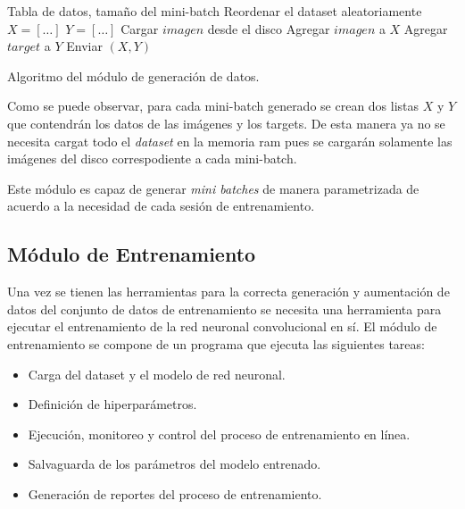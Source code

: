     \begin{algorithm}
        \begin{algorithmic}[1]
        \REQUIRE Tabla de datos, tamaño del mini-batch
        \STATE Reordenar el dataset aleatoriamente
            \STATE $X = [\dots]$
            \STATE $Y = [\dots]$
                \STATE Cargar $imagen$ desde el disco 
                \STATE Agregar $imagen$ a $X$
                \STATE Agregar $target$ a $Y$
            \ENDFOR
            \STATE Enviar $(X,Y)$
        \ENDFOR
        
        \end{algorithmic}
        \caption{Algoritmo del módulo de generación de datos.}\label{alg:datagen}
    \end{algorithm}

    Como se puede observar, para cada mini-batch generado se crean dos listas $X$ y $Y$ que contendrán los datos de 
    las imágenes y los targets. De esta manera ya no se necesita cargat todo el \textit{dataset} en la memoria ram pues se 
    cargarán solamente las imágenes del disco correspodiente a cada mini-batch.

    Este módulo es capaz de generar \textit{mini batches} de manera parametrizada de acuerdo a la necesidad de cada sesión de 
    entrenamiento.

    \subsection{Módulo de Entrenamiento}
    Una vez se tienen las herramientas para la correcta generación y aumentación de datos del conjunto de datos de entrenamiento 
    se necesita una herramienta para ejecutar el entrenamiento de la red neuronal convolucional en sí. El módulo de entrenamiento 
    se compone de un programa que ejecuta las siguientes tareas:

    \begin{itemize}
        \item Carga del dataset y el modelo de red neuronal.
        \item Definición de hiperparámetros.
        \item Ejecución, monitoreo y control del proceso de entrenamiento en línea. 
        \item Salvaguarda de los parámetros del modelo entrenado.
        \item Generación de reportes del proceso de entrenamiento.
    \end{itemize}

